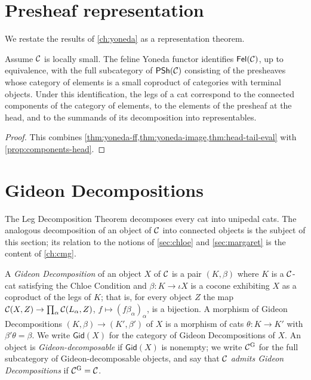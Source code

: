 \section{Presheaf representation}\label{sec:presheaf-rep}

We restate the results of \cref{ch:yoneda} as a representation theorem.

\begin{corollary}\label{cor:representation}
Assume $\mathcal{C}$ is locally small. The feline Yoneda functor identifies $\mathsf{Fel}(\mathcal{C})$,
up to equivalence, with the full subcategory of $\mathsf{PSh}(\mathcal{C})$ consisting of the
presheaves whose category of elements is a small coproduct of categories with
terminal objects. Under this identification, the legs of a cat correspond to the
connected components of the category of elements, to the elements of the
presheaf at the head, and to the summands of its decomposition into
representables.
\end{corollary}

\begin{proof}
This combines \cref{thm:yoneda-ff,thm:yoneda-image,thm:head-tail-eval} with
\cref{prop:components-head}.
\end{proof}

\section{Gideon Decompositions}\label{sec:gideon}

The Leg Decomposition Theorem decomposes every cat into unipedal cats. The
analogous decomposition of an object of $\mathcal{C}$ into connected objects is the
subject of this section; its relation to the notions of \cref{sec:chloe} and
\cref{sec:margaret} is the content of \cref{ch:cmg}.

\begin{definition}\label{def:gideon}
A \emph{Gideon Decomposition} of an object $X$ of $\mathcal{C}$ is a pair $(K,\beta)$
where $K$ is a $\mathcal{C}$-cat satisfying the Chloe Condition and $\beta\colon K\to\iota X$
is a cocone exhibiting $X$ as a coproduct of the legs of $K$; that is, for every
object $Z$ the map $\mathcal{C}(X,Z)\to\prod_\alpha\mathcal{C}(L_\alpha,Z)$, $f\mapsto(f\beta_\alpha)_\alpha$,
is a bijection. A morphism of Gideon Decompositions $(K,\beta)\to(K',\beta')$
of $X$ is a morphism of cats $\theta\colon K\to K'$ with $\beta'\theta=\beta$.
We write $\mathsf{Gid}(X)$ for the category of Gideon Decompositions of $X$.
An object is \emph{Gideon-decomposable} if $\mathsf{Gid}(X)$ is nonempty; we
write $\mathcal{C}^{\mathrm{G}}$ for the full subcategory of Gideon-decomposable objects, and
say that $\mathcal{C}$ \emph{admits Gideon Decompositions} if $\mathcal{C}^{\mathrm{G}}=\mathcal{C}$.
\end{definition}

